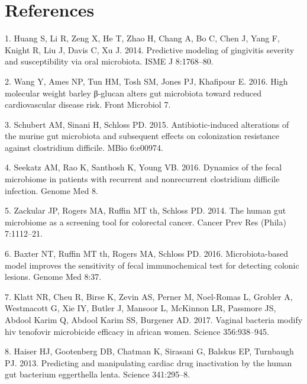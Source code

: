 \documentclass[12pt,]{article}
\begin{document}
\newpage

\section*{References}\label{references}

\hypertarget{refs}{}
\hypertarget{ref-Huang_gingivitis_2014}{}
1. Huang S, Li R, Zeng X, He T, Zhao H, Chang A, Bo C, Chen J, Yang F,
Knight R, Liu J, Davis C, Xu J. 2014. Predictive modeling of gingivitis
severity and susceptibility via oral microbiota. ISME J 8:1768--80.

\hypertarget{ref-Wang_cvdrisk_2016}{}
2. Wang Y, Ames NP, Tun HM, Tosh SM, Jones PJ, Khafipour E. 2016. High
molecular weight barley β-glucan alters gut microbiota toward reduced
cardiovascular disease risk. Front Microbiol 7.

\hypertarget{ref-Schubert_cdiff_2015}{}
3. Schubert AM, Sinani H, Schloss PD. 2015. Antibiotic-induced
alterations of the murine gut microbiota and subsequent effects on
colonization resistance against clostridium difficile. MBio 6:e00974.

\hypertarget{ref-Seekatz_cdiff_2016}{}
4. Seekatz AM, Rao K, Santhosh K, Young VB. 2016. Dynamics of the fecal
microbiome in patients with recurrent and nonrecurrent clostridium
difficile infection. Genome Med 8.

\hypertarget{ref-zackular_CRC_2014}{}
5. Zackular JP, Rogers MA, Ruffin MT th, Schloss PD. 2014. The human gut
microbiome as a screening tool for colorectal cancer. Cancer Prev Res
(Phila) 7:1112--21.

\hypertarget{ref-baxter_FIT_2016}{}
6. Baxter NT, Ruffin MT th, Rogers MA, Schloss PD. 2016.
Microbiota-based model improves the sensitivity of fecal immunochemical
test for detecting colonic lesions. Genome Med 8:37.

\hypertarget{ref-Klatt_microbicide_2017}{}
7. Klatt NR, Cheu R, Birse K, Zevin AS, Perner M, Noel-Romas L, Grobler
A, Westmacott G, Xie IY, Butler J, Mansoor L, McKinnon LR, Passmore JS,
Abdool Karim Q, Abdool Karim SS, Burgener AD. 2017. Vaginal bacteria
modify hiv tenofovir microbicide efficacy in african women. Science
356:938--945.

\hypertarget{ref-Haiser_cardiac_2013}{}
8. Haiser HJ, Gootenberg DB, Chatman K, Sirasani G, Balskus EP,
Turnbaugh PJ. 2013. Predicting and manipulating cardiac drug
inactivation by the human gut bacterium eggerthella lenta. Science
341:295--8.
\end{document}
